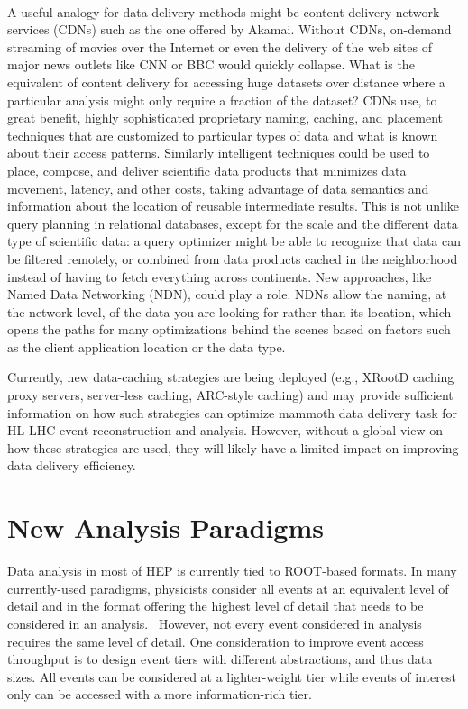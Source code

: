 \documentclass[12pt,a4paper]{article}
\begin{document}
~

A useful analogy for data delivery methods might be content delivery
network services (CDNs) such as the one offered by Akamai. Without CDNs,
%
%
on-demand streaming of movies over the Internet or even the delivery of
the web sites of major news outlets like CNN or BBC would quickly
collapse. What is the equivalent of content delivery for accessing huge
datasets over distance where a particular analysis might only
require a fraction of the dataset? CDNs use, to great benefit, highly
sophisticated proprietary naming, caching, and placement techniques
that are customized to particular types of data and what is known about
their access patterns. Similarly intelligent techniques could be used to
place, compose, and deliver scientific data products that minimizes data
movement, latency, and other costs, taking advantage of data semantics
and information about the location of reusable intermediate results.
This is not unlike query planning in relational databases, except for
the scale and the different data type of scientific data: a query
optimizer might be able to recognize that data can be filtered remotely,
or combined from data products cached in the neighborhood instead of
having to fetch everything across continents. New approaches, like Named
Data Networking (NDN), could play a role. NDNs allow the naming, at the
network level, of the data you are looking for rather than its location, which
opens the paths for many optimizations behind the scenes based on
factors such as the client application location or the data type.

Currently, new data-caching strategies are being deployed (e.g., XRootD
caching proxy servers, server-less caching, ARC-style caching) and may
%
%
provide sufficient information on how such strategies can optimize
mammoth data delivery task for HL-LHC event reconstruction and analysis.
However, without a global view on how these strategies are used, they
will likely have a limited impact on improving data delivery efficiency.

\section{New Analysis Paradigms}\label{new-analysis-paradigms}

Data analysis in most of HEP is currently tied to ROOT-based formats. In many
currently-used paradigms, physicists consider all events at an
equivalent level of detail and in the format offering the highest level
of detail that needs to be considered in an analysis. ~However, not
every event considered in analysis requires the same level of detail.
One consideration to improve event access throughput is to design event
tiers with different abstractions, and thus data sizes. All events can
be considered at a lighter-weight tier while events of interest only can
be accessed with a more information-rich tier.
\end{document}
